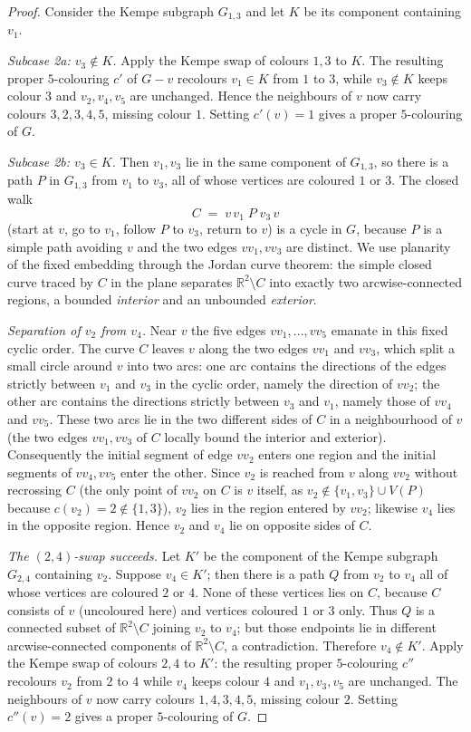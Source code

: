 \documentclass{amsart}
\theoremstyle{remark}
\begin{document}
\begin{proof}
Consider the Kempe subgraph $G_{1,3}$ and let $K$ be its component containing
$v_1$.

\emph{Subcase 2a: $v_3\notin K$.} Apply the Kempe swap of colours $1,3$ to $K$.
The resulting proper $5$-colouring $c'$ of $G-v$ recolours $v_1\in K$ from $1$ to
$3$, while $v_3\notin K$ keeps colour $3$ and $v_2,v_4,v_5$ are unchanged. Hence
the neighbours of $v$ now carry colours $3,2,3,4,5$, missing colour $1$. Setting
$c'(v)=1$ gives a proper $5$-colouring of $G$.

\emph{Subcase 2b: $v_3\in K$.} Then $v_1,v_3$ lie in the same component of
$G_{1,3}$, so there is a path $P$ in $G_{1,3}$ from $v_1$ to $v_3$, all of whose
vertices are coloured $1$ or $3$. The closed walk
\[
   C \;=\; v\,v_1\;P\;v_3\,v
\]
(start at $v$, go to $v_1$, follow $P$ to $v_3$, return to $v$) is a cycle in $G$,
because $P$ is a simple path avoiding $v$ and the two edges $vv_1,vv_3$ are
distinct. We use planarity of the fixed embedding through the Jordan curve
theorem: the simple closed curve traced by $C$ in the plane separates
$\mathbb{R}^2\setminus C$ into exactly two arcwise-connected regions, a bounded
\emph{interior} and an unbounded \emph{exterior}.

\emph{Separation of $v_2$ from $v_4$.} Near $v$ the five edges $vv_1,\dots,vv_5$
emanate in this fixed cyclic order. The curve $C$ leaves $v$ along the two edges
$vv_1$ and $vv_3$, which split a small circle around $v$ into two arcs: one arc
contains the directions of the edges strictly between $v_1$ and $v_3$ in the
cyclic order, namely the direction of $vv_2$; the other arc contains the
directions strictly between $v_3$ and $v_1$, namely those of $vv_4$ and $vv_5$.
These two arcs lie in the two different sides of $C$ in a neighbourhood of $v$
(the two edges $vv_1,vv_3$ of $C$ locally bound the interior and exterior).
Consequently the initial segment of edge $vv_2$ enters one region and the initial
segments of $vv_4,vv_5$ enter the other. Since $v_2$ is reached from $v$ along
$vv_2$ without recrossing $C$ (the only point of $vv_2$ on $C$ is $v$ itself,
as $v_2\notin\{v_1,v_3\}\cup V(P)$ because $c(v_2)=2\notin\{1,3\}$), $v_2$ lies in
the region entered by $vv_2$; likewise $v_4$ lies in the opposite region. Hence
$v_2$ and $v_4$ lie on opposite sides of $C$.

\emph{The $(2,4)$-swap succeeds.} Let $K'$ be the component of the Kempe subgraph
$G_{2,4}$ containing $v_2$. Suppose $v_4\in K'$; then there is a path $Q$ from
$v_2$ to $v_4$ all of whose vertices are coloured $2$ or $4$. None of these
vertices lies on $C$, because $C$ consists of $v$ (uncoloured here) and vertices
coloured $1$ or $3$ only. Thus $Q$ is a connected subset of
$\mathbb{R}^2\setminus C$ joining $v_2$ to $v_4$; but those endpoints lie in
different arcwise-connected components of $\mathbb{R}^2\setminus C$, a
contradiction. Therefore $v_4\notin K'$. Apply the Kempe swap of colours $2,4$ to
$K'$: the resulting proper $5$-colouring $c''$ recolours $v_2$ from $2$ to $4$
while $v_4$ keeps colour $4$ and $v_1,v_3,v_5$ are unchanged. The neighbours of
$v$ now carry colours $1,4,3,4,5$, missing colour $2$. Setting $c''(v)=2$ gives a
proper $5$-colouring of $G$.


\end{proof}
\end{document}
